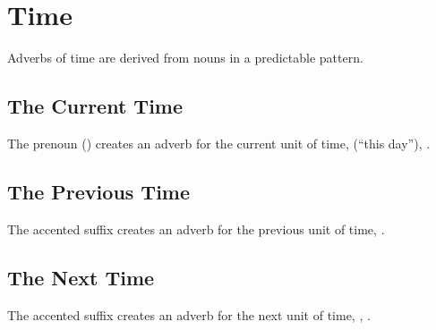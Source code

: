 \section{Time}
\noindent Adverbs of time are derived from nouns in a predictable
pattern.

\subsection{The Current Time} The prenoun 
() creates an adverb for the current unit
of time,   (``this day''),  . 

\subsection{The Previous Time} The accented suffix  creates an
adverb for the previous unit of time,  
 .

\subsection{The Next Time} The accented suffix  creates an
adverb for the next unit of time,  , 
 .
